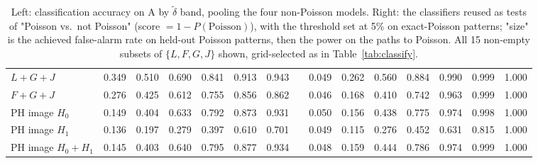 \documentclass[10pt,a4paper]{article}
\newcommand{\dtil}{\tilde\delta}
\begin{document}
\begin{table}[ht]
\begin{tabular}{@{}l cccccc c c cccccc@{}}
$L{+}G{+}J$ & 0.349 & 0.510 & 0.690 & 0.841 & 0.913 & 0.943 & & 0.049 & 0.262 & 0.560 & 0.884 & 0.990 & 0.999 & 1.000\\
$F{+}G{+}J$ & 0.276 & 0.425 & 0.612 & 0.755 & 0.856 & 0.862 & & 0.046 & 0.168 & 0.410 & 0.742 & 0.963 & 0.999 & 1.000\\
PH image $H_0$ & 0.149 & 0.404 & 0.633 & 0.792 & 0.873 & 0.931 & & 0.050 & 0.156 & 0.438 & 0.775 & 0.974 & 0.998 & 1.000\\
PH image $H_1$ & 0.136 & 0.197 & 0.279 & 0.397 & 0.610 & 0.701 & & 0.049 & 0.115 & 0.276 & 0.452 & 0.631 & 0.815 & 1.000\\
PH image $H_0{+}H_1$ & 0.145 & 0.403 & 0.640 & 0.795 & 0.877 & 0.934 & & 0.048 & 0.159 & 0.444 & 0.786 & 0.974 & 0.999 & 1.000\\
\bottomrule
\end{tabular}
\caption{Left: classification accuracy on A by $\dtil$ band, pooling the four non-Poisson models. Right: the classifiers reused as tests of "Poisson vs.\ not Poisson" (score $=1-P(\text{Poisson})$), with the threshold set at 5\% on exact-Poisson patterns; "size" is the achieved false-alarm rate on held-out Poisson patterns, then the power on the paths to Poisson. All 15 non-empty subsets of $\{L,F,G,J\}$ shown, grid-selected as in Table~\ref{tab:classify}.}
\label{tab:classify-delta}
\end{table}
\end{document}
